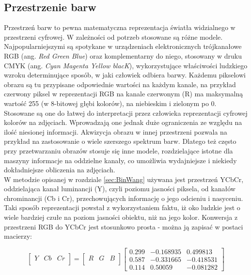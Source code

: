 \subsection{Przestrzenie barw}
Przestrzeń barw to pewna matematyczna reprezentacja światła widzialnego w przestrzeni cyfrowej. W zależności od potrzeb stosowane są różne modele. Najpopularniejszymi są spotykane w urządzeniach elektronicznych trójkanałowe RGB (ang. \textit{Red Green Blue}) oraz komplementarny do niego, stosowany w druku CMYK (ang. \textit{Cyan Magenta Yellow blacK}), wykorzystujące właściwości ludzkiego wzroku determinujące sposób, w jaki człowiek odbiera barwy. Każdemu pikselowi obrazu są tu przypisane odpowiednie wartości na każdym kanale, na przykład czerwony piksel w reprezentacji RGB na kanale czerwonym (R) ma maksymalną wartość 255 (w 8-bitowej głębi kolorów), na niebieskim i zielonym po 0. Stosowane są one do łatwej do interpretacji przez człowieka reprezentacji cyfrowej kolorów na zdjęciach. Wprowadzają one jednak duże ograniczenia ze względu na ilość niesionej informacji. Akwizycja obrazu w innej przestrzeni pozwala na przykład na zastosowanie o wiele szerszego spektrum barw. Dlatego też często przy przetwarzaniu obrazów stosuje się inne modele, rozdzielające istotne dla maszyny informacje na oddzielne kanały, co umożliwia wydajniejsze i niekiedy dokładniejsze obliczenia na zdjęciach. \\
W metodzie opisanej w rozdziale \ref{sec:BinWang}  używana jest przestrzeń YCbCr, oddzielająca kanał luminancji (Y), czyli poziomu jasności piksela, od kanałów chrominancji (Cb i Cr), przechowujących informację o jego odcieniu i nasyceniu. Taki sposób reprezentacji powstał z wykorzystaniem faktu, iż oko ludzkie jest o wiele bardziej czułe na poziom jasności obiektu, niż na jego kolor. Konwersja z przestrzeni RGB do YCbCr jest stosunkowo prosta - można ją zapisać w postaci macierzy:

\[
\begin{bmatrix}
    Y & Cb & Cr \\
\end{bmatrix}
=
\begin{bmatrix}
    R & G & B \\
\end{bmatrix}
\begin{bmatrix}
    0.299 & -0.168935 & 0.499813 \\
    0.587 & -0.331665 & -0.418531 \\
    0.114 & 0.50059 & -0.081282 
\end{bmatrix}
\]

